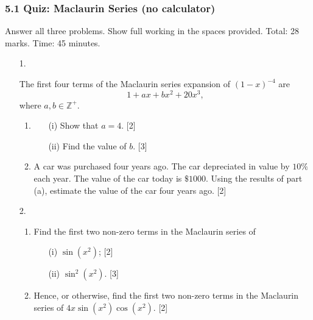 \documentclass[12pt, twoside]{article}
\begin{document}
\subsubsection*{5.1 Quiz: Maclaurin Series (no calculator)}

Answer all three problems. Show full working in the spaces provided.
Total: 28 marks. Time: 45 minutes.

\begin{enumerate}[itemsep=0.15cm]

\item[1.] 

The first four terms of the Maclaurin series expansion of $(1 - x)^{-4}$ are
\[
1 + ax + bx^2 + 20x^3,
\]
where $a, b \in \mathbb{Z}^{+}$.

\begin{enumerate}[itemsep=0.15cm]
  \item \begin{enumerate}[itemsep=0.15cm]
    \item[(i)] Show that $a = 4$. \hfill [2]
    \item[(ii)] Find the value of $b$. \hfill [3]
  \end{enumerate}
  \item A car was purchased four years ago. The car depreciated in value by
  $10\%$ each year. The value of the car today is $\$1000$. Using the results
  of part (a), estimate the value of the car four years ago. \hfill [2]
\end{enumerate}


\newpage

\item[2.] 

\begin{enumerate}[itemsep=0.15cm]
  \item Find the first two non-zero terms in the Maclaurin series of
  \begin{enumerate}[itemsep=0.15cm]
    \item[(i)] $\sin\!\left(x^{2}\right)$; \hfill [2]
    \item[(ii)] $\sin^{2}\!\left(x^{2}\right)$. \hfill [3]
  \end{enumerate}
  \item Hence, or otherwise, find the first two non-zero terms in the
  Maclaurin series of $4x \sin\!\left(x^{2}\right) \cos\!\left(x^{2}\right)$.
  \hfill [2]
\end{enumerate}


\end{enumerate}
\end{document}
